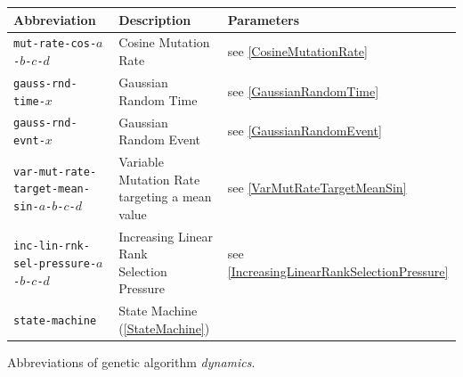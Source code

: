 \begin{adjustwidth}{-3cm}{-3cm}
    \centering
    \begin{tabular}{|l|l|l|}
    \hline
    \rowcolor[HTML]{DCDCDC} 
    \textbf{Abbreviation}                                                            & \textbf{Description}                                         & \textbf{Parameters}                             \\ \hline
    \texttt{mut-rate-cos-}$a$\texttt{-}$b$\texttt{-}$c$\texttt{-}$d$                 & Cosine Mutation Rate                                         & see \ref{CosineMutationRate}                    \\ \hline
    \texttt{gauss-rnd-time-}$x$                                                      & Gaussian Random Time                                         & see \ref{GaussianRandomTime}                    \\ \hline
    \texttt{gauss-rnd-evnt-}$x$                                                      & Gaussian Random Event                                        & see \ref{GaussianRandomEvent}                   \\ \hline
    \texttt{var-mut-rate-target-mean-sin-}$a$\texttt{-}$b$\texttt{-}$c$\texttt{-}$d$ & \makecell[l]{Variable Mutation Rate\\targeting a mean value} & see \ref{VarMutRateTargetMeanSin}               \\ \hline
    \texttt{inc-lin-rnk-sel-pressure-}$a$\texttt{-}$b$\texttt{-}$c$\texttt{-}$d$     & \makecell[l]{Increasing Linear Rank\\Selection Pressure}     & see \ref{IncreasingLinearRankSelectionPressure} \\ \hline
    \texttt{state-machine}                                                           & State Machine (\ref{StateMachine})                           &                                                 \\ \hline
    \end{tabular}
    \caption{Abbreviations of genetic algorithm \textit{dynamics}.}
    \label{tab:ga-dynamic-abbr}
\end{adjustwidth}

